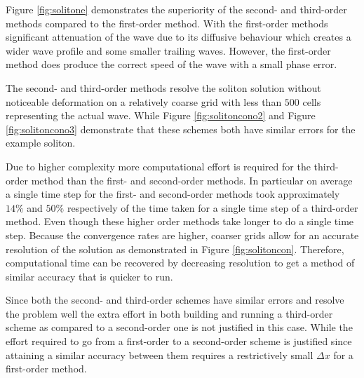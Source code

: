 \documentclass[SingleSpace,12pt]{Serre_ASCE}
\begin{document}
Figure \ref{fig:solitone} demonstrates the superiority of the second- and third-order methods compared to the first-order method. With the first-order methods significant attenuation of the wave due to its diffusive behaviour which creates a wider wave profile and some smaller trailing waves. However, the first-order method does produce the correct speed of the wave with a small phase error. 

The second- and third-order methods resolve the soliton solution without noticeable deformation on a relatively coarse grid with less than $500$ cells representing the actual wave. While Figure \ref{fig:solitoncono2} and Figure \ref{fig:solitoncono3}  demonstrate that these schemes both have similar errors for the example soliton.

Due to higher complexity more computational effort is required for the third-order method than the first- and second-order methods. In particular on average a single time step for the first- and second-order methods took approximately $14\%$ and $50\%$ respectively of the time taken for a single time step of a third-order method. Even though these higher order methods take longer to do a single time step. Because the convergence rates are higher, coarser grids allow for an accurate resolution of the solution as demonstrated in Figure \ref{fig:solitoncon}. Therefore, computational time can be recovered by decreasing resolution to get a method of similar accuracy that is quicker to run.

Since both the second- and third-order schemes have similar errors and resolve the problem well the extra effort in both building and running a third-order scheme as compared to a second-order one is not justified in this case. While the effort required to go from a first-order to a second-order scheme is justified since attaining a similar accuracy between them requires a restrictively small $\Delta x$ for a first-order method.   

\end{document}
